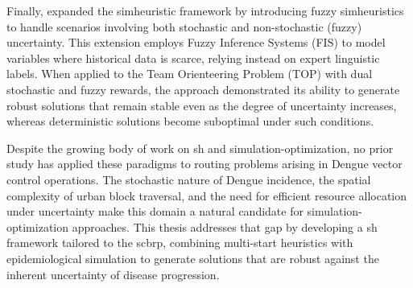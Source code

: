 Finally, \cite{oliva2020fuzzy} expanded the simheuristic framework by introducing fuzzy simheuristics to handle scenarios involving both stochastic and non-stochastic (fuzzy) uncertainty. This extension employs Fuzzy Inference Systems (FIS) to model variables where historical data is scarce, relying instead on expert linguistic labels. When applied to the Team Orienteering Problem (TOP) with dual stochastic and fuzzy rewards, the approach demonstrated its ability to generate robust solutions that remain stable even as the degree of uncertainty increases, whereas deterministic solutions become suboptimal under such conditions.

Despite the growing body of work on \gls{sh} and simulation-optimization, no prior study has applied these paradigms to routing problems arising in Dengue vector control operations. The stochastic nature of Dengue incidence, the spatial complexity of urban block traversal, and the need for efficient resource allocation under uncertainty make this domain a natural candidate for simulation-optimization approaches. This thesis addresses that gap by developing a \gls{sh} framework tailored to the \gls{scbrp}, combining multi-start heuristics with epidemiological simulation to generate solutions that are robust against the inherent uncertainty of disease progression.